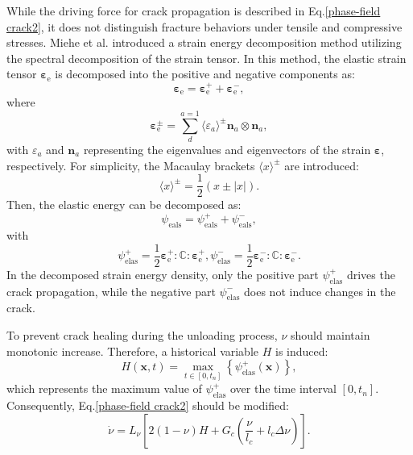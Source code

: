 While the driving force for crack propagation is described in Eq.\eqref{phase-field crack2}, it does not distinguish fracture behaviors under tensile and compressive stresses. Miehe et al. \cite{miehe_thermodynamically_2010} introduced a strain energy decomposition method utilizing the spectral decomposition of the strain tensor. In this method, the elastic strain tensor $\mathbf{\varepsilon}_\mathrm{e}$ is decomposed into the positive and negative components as:
\begin{equation}
    \mathbf{\varepsilon}_\mathrm{e}=\mathbf{\varepsilon}^+_\mathrm{e} + \mathbf{\varepsilon}^-_\mathrm{e}  ,
\end{equation}
where 
\begin{equation}
    \mathbf{\varepsilon}_\mathrm{e}^\pm=\sum_{d}^{a=1}\langle \varepsilon_a\rangle^\pm \mathbf{n}_a\otimes\mathbf{n}_a,
\end{equation}
with $\varepsilon_a$ and $\mathbf{n}_a$ representing the eigenvalues and eigenvectors of the strain $\mathbf{\varepsilon}$, respectively. For simplicity, the Macaulay brackets $\langle x \rangle^\pm$ are introduced: 
\begin{equation}
    \langle x \rangle^\pm = \frac{1}{2}(x\pm |x|).
\end{equation}
Then, the elastic energy can be decomposed as:
\begin{equation}
    \psi_\mathrm{eals}=\psi_\mathrm{eals}^++\psi_\mathrm{eals}^-,
\end{equation}
with 
\begin{subequations}
    \begin{equation}
        \psi^+_\mathrm{elas}=\frac{1}{2}\mathbf{\varepsilon}_\mathrm{e}^+ : \mathbb{C} : \mathbf{\varepsilon}_\mathrm{e}^+,
    \end{equation}
    \begin{equation}
        \psi^-_\mathrm{elas}=\frac{1}{2}\mathbf{\varepsilon}_\mathrm{e}^- : \mathbb{C} : \mathbf{\varepsilon}_\mathrm{e}^-.
    \end{equation}
\end{subequations}
In the decomposed strain energy density, only the positive part $\psi^+_\mathrm{elas}$ drives the crack propagation, while the negative part $\psi^-_\mathrm{elas}$ does not induce changes in the crack. 

To prevent crack healing during the unloading process, $\nu$ should maintain monotonic increase. Therefore, a historical variable $H$ is induced:
\begin{equation}
    H(\mathbf{x},t)=\max_{t\in [0,t_n]} \left\{  \psi^+_\mathrm{elas}(\mathbf{x})\right\},
\end{equation}
which represents the maximum value of $\psi^+_\mathrm{elas}$ over the time interval $[0,t_n]$. Consequently, Eq.\eqref{phase-field crack2} should be modified:
\begin{equation}
    \dot{\nu}=L_\nu\left[ 2(1-\nu)H+G_c\left(\frac{\nu}{l_c} + l_c\Delta \nu\right) \right].
\end{equation}

